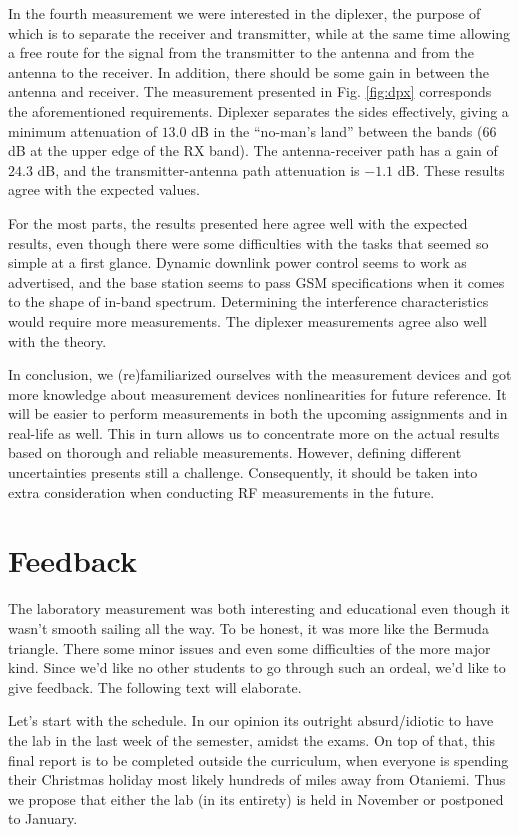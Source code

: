 \documentclass[a4paper, 12pt]{article}
\begin{document}
In the fourth measurement we were interested in the diplexer, the purpose of which 
is to separate the receiver and transmitter, while at the same time allowing a 
free route for the signal from the transmitter to the antenna and from the antenna 
to the receiver. In addition, there should be some gain in between the antenna 
and receiver. The measurement presented in Fig. \ref{fig:dpx} corresponds the 
aforementioned requirements. Diplexer separates the sides effectively, giving 
a minimum attenuation of $13.0$ dB in the ``no-man's land'' between the bands 
(66 dB at the upper edge of the RX band). The antenna-receiver path has a gain 
of $24.3$ dB, and the transmitter-antenna path attenuation is $-1.1$ dB. These 
results agree with the expected values.

For the most parts, the results presented here agree well with the expected 
results, even though there were some difficulties with the tasks that seemed 
so simple at a first glance. Dynamic downlink power control seems to work as 
advertised, and the base station seems to pass GSM specifications when it comes 
to the shape of in-band spectrum. Determining the interference characteristics 
would require more measurements. The diplexer measurements agree also well with the 
theory. 

In conclusion, we (re)familiarized ourselves with the measurement devices and got 
more knowledge about measurement devices nonlinearities for future reference.
It will be easier to perform measurements in both the upcoming assignments and in 
real-life as well. This in turn allows us to concentrate more on the actual results 
based on thorough and reliable measurements. However, defining different uncertainties 
presents still a challenge. Consequently, it should be taken into extra consideration 
when conducting RF measurements in the future.


\newpage
\section{Feedback}

The laboratory measurement was both interesting and educational 
even though it wasn't smooth sailing all the way. To be honest, 
it was more like the Bermuda triangle. There some minor 
issues and even some difficulties of the more major kind. Since 
we'd like no other students to go through such an ordeal, we'd like 
to give feedback. The following text will elaborate.

Let's start with the schedule. In our opinion its outright absurd/idiotic 
to have the lab in the last week of the semester, amidst the exams. On 
top of that, this final report is to be completed outside the 
curriculum, when everyone is spending their Christmas holiday 
most likely hundreds of miles away from Otaniemi. Thus we propose 
that either the lab (in its entirety) is held in November or postponed 
to January.
\end{document}
